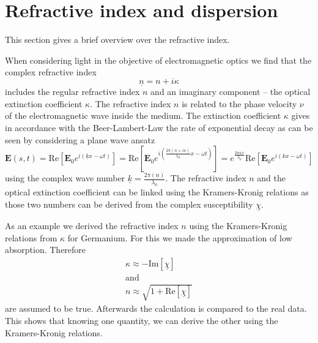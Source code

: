 \section{Refractive index and dispersion}

This section gives a brief overview over the refractive index.

When considering light in the objective of electromagnetic optics we find that the complex refractive index
\begin{equation}
    \underline{n} = n + i \kappa \label{eq:refindex}
\end{equation}
includes the  regular refractive index  $n$ and an imaginary component -- the optical extinction coefficient
 $\kappa$. The refractive index $n$ is related to the 
phase velocity $\nu$ of the electromagnetic wave inside the medium. The extinction coefficient $\kappa$ gives 
in accordance with the Beer-Lambert-Law the rate of exponential decay as can be seen
by considering a plane wave ansatz
\begin{equation}
    \mathbf{E}(s,t) = \mathrm{Re}[ \mathbf{E}_{0} e^{i( \underline{k} x-\omega t)}]  = 
    \mathrm{Re}[ \mathbf{E}_{0} e^{i( \frac{2 \pi (n + i \kappa)}{\lambda_0} x-\omega t)}] =
    e^{\frac{2 \pi \kappa x}{\lambda_0}}\mathrm{Re}[ \mathbf{E}_{0} e^{i( k x-\omega t)}]
\end{equation}
using the complex wave number $\underline{k} = \frac{2 \pi (\underline{n})}{\lambda_0}$. The refractive index $n$
and the optical extinction coefficient can be linked using the Kramers-Kronig relations as those two numbers can be 
derived from the complex susceptibility $\underline{\chi}$.

As an example we derived the refractive index $n$ using the Kramers-Kronig relations from $\kappa$ for Germanium. For this we made the
approximation of low absorption. Therefore 
\begin{gather*}
    \kappa \approx - \mathrm{Im}[\underline{\chi}]\\
    \mathrm{and}\\
    n \approx \sqrt{1 + \mathrm{Re}[\underline{\chi}]}
\end{gather*}
are assumed to be true. Afterwards the calculation is compared to the real data. This shows that knowing one quantity, we can derive the other using the Kramers-Kronig relations.

